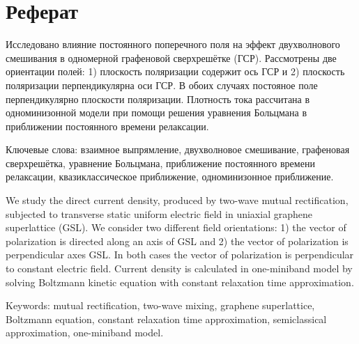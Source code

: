 \section*{Реферат}
Исследовано влияние постоянного поперечного поля на эффект двухволнового смешивания в одномерной графеновой сверхрешётке (ГСР). Рассмотрены две ориентации полей: 1) плоскость поляризации содержит ось ГСР и 2) плоскость поляризации перпендикулярна оси ГСР. В обоих случаях постояное поле перпендикулярно плоскости поляризации. Плотность тока рассчитана в одноминизонной модели при помощи решения уравнения Больцмана в приближении постоянного времени релаксации.

\vspace{1cm}\noindent\nohyphens{%
Ключевые слова: взаимное выпрямление, двухволновое смешивание, графеновая сверхрешётка, уравнение Больцмана, приближение постоянного времени релаксации, квазиклассическое приближение, одноминизонное приближение.}

\vspace{3cm}
We study the direct current density, produced by two-wave mutual rectification, subjected to transverse static uniform electric field in uniaxial graphene superlattice (GSL). We consider two different field orientations: 1) the vector of polarization is directed along an axis of GSL and 2) the vector of polarization is perpendicular axes GSL. In both cases the vector of polarization is perpendicular to constant electric field. Current density is calculated in one-miniband model by solving Boltzmann kinetic equation with constant relaxation time approximation.

\vspace{1cm}\noindent\nohyphens{%
Keywords: mutual rectification, two-wave mixing, graphene superlattice, Boltzmann equation, constant relaxation time approximation, semiclassical approximation, one-miniband model.}